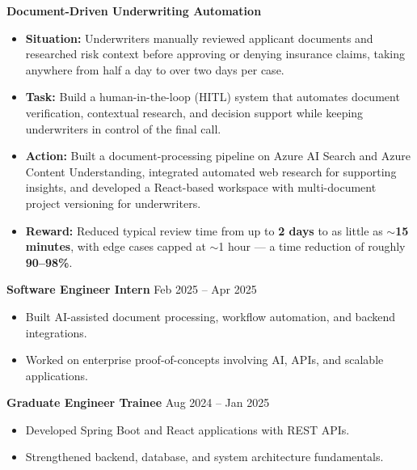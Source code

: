 \documentclass[a4paper,10pt]{article}
\newcommand{\expblock}[1]{\noindent\textbf{#1}\par\vspace{1pt}}
\begin{document}
\vspace{4pt}
\expblock{Document-Driven Underwriting Automation}
\begin{itemize}
\item \textbf{Situation:} Underwriters manually reviewed applicant documents and researched risk context before approving or denying insurance claims, taking anywhere from half a day to over two days per case.
\item \textbf{Task:} Build a human-in-the-loop (HITL) system that automates document verification, contextual research, and decision support while keeping underwriters in control of the final call.
\item \textbf{Action:} Built a document-processing pipeline on Azure AI Search and Azure Content Understanding, integrated automated web research for supporting insights, and developed a React-based workspace with multi-document project versioning for underwriters.
\item \textbf{Reward:} Reduced typical review time from up to \textbf{2 days} to as little as \textbf{$\sim$15 minutes}, with edge cases capped at $\sim$1 hour — a time reduction of roughly \textbf{90--98\%}.
\end{itemize}

\vspace{10pt}
\noindent\textbf{Software Engineer Intern} \hfill Feb 2025 -- Apr 2025
\begin{itemize}
\item Built AI-assisted document processing, workflow automation, and backend integrations.
\item Worked on enterprise proof-of-concepts involving AI, APIs, and scalable applications.
\end{itemize}

\vspace{4pt}
\noindent\textbf{Graduate Engineer Trainee} \hfill Aug 2024 -- Jan 2025
\begin{itemize}
\item Developed Spring Boot and React applications with REST APIs.
\item Strengthened backend, database, and system architecture fundamentals.
\end{itemize}

\end{document}
